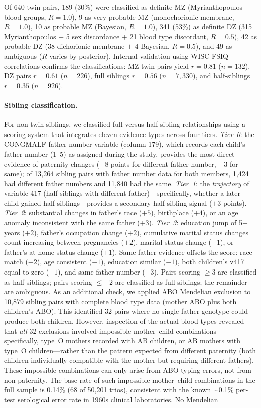\documentclass[12pt]{article}
\begin{document}
Of 640 twin pairs, 189 (30\%) were classified as definite MZ (Myrianthopoulos blood groups, $R = 1.0$), 9 as very probable MZ (monochorionic membrane, $R = 1.0$), 10 as probable MZ (Bayesian, $R = 1.0$), 341 (53\%) as definite DZ (315 Myrianthopoulos $+$ 5 sex discordance $+$ 21 blood type discordant, $R = 0.5$), 42 as probable DZ (38 dichorionic membrane $+$ 4 Bayesian, $R = 0.5$), and 49 as ambiguous ($R$ varies by posterior). Internal validation using WISC FSIQ correlations confirms the classifications: MZ twin pairs yield $r = 0.81$ ($n = 132$), DZ pairs $r = 0.61$ ($n = 226$), full siblings $r = 0.56$ ($n = 7{,}330$), and half-siblings $r = 0.35$ ($n = 926$).

\paragraph{Sibling classification.} For non-twin siblings, we classified full versus half-sibling relationships using a scoring system that integrates eleven evidence types across four tiers. \textit{Tier~0}: the CONGMALF father number variable (column 179), which records each child's father number (1--5) as assigned during the study, provides the most direct evidence of paternity changes ($+8$ points for different father number, $-3$ for same); of 13,264 sibling pairs with father number data for both members, 1,424 had different father numbers and 11,840 had the same. \textit{Tier~1}: the \textit{trajectory} of variable 417 (half-siblings with different father)---specifically, whether a later child gained half-siblings---provides a secondary half-sibling signal ($+3$ points). \textit{Tier~2}: substantial changes in father's race ($+5$), birthplace ($+4$), or an age anomaly inconsistent with the same father ($+3$). \textit{Tier~3}: education jump of 5+ years ($+2$), father's occupation change ($+2$), cumulative marital status changes count increasing between pregnancies ($+2$), marital status change ($+1$), or father's at-home status change ($+1$). Same-father evidence offsets the score: race match ($-2$), age consistent ($-1$), education similar ($-1$), both children's v417 equal to zero ($-1$), and same father number ($-3$). Pairs scoring $\geq 3$ are classified as half-siblings; pairs scoring $\leq -2$ are classified as full siblings; the remainder are ambiguous. As an additional check, we applied ABO Mendelian exclusion to 10,879 sibling pairs with complete blood type data (mother ABO plus both children's ABO). This identified 32 pairs where no single father genotype could produce both children. However, inspection of the actual blood types revealed that \textit{all} 32 exclusions involved impossible mother--child combinations---specifically, type~O mothers recorded with AB children, or AB mothers with type~O children---rather than the pattern expected from different paternity (both children individually compatible with the mother but requiring different fathers). These impossible combinations can only arise from ABO typing errors, not from non-paternity. The base rate of such impossible mother--child combinations in the full sample is 0.14\% (68 of 50,201 trios), consistent with the known $\sim$0.1\% per-test serological error rate in 1960s clinical laboratories. No Mendelian 
\end{document}
